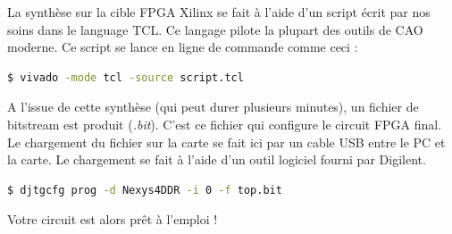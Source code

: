 La synthèse sur la cible FPGA Xilinx se fait à l'aide d'un script écrit par nos soins dans le language TCL. Ce langage pilote la plupart des outils de CAO moderne.
Ce script se lance en ligne de commande comme ceci :

\begin{lstlisting}[language=bash]
  $ vivado -mode tcl -source script.tcl
\end{lstlisting}

A l'issue de cette synthèse (qui peut durer plusieurs minutes), un fichier de bitstream est produit ({\it .bit}). C'est ce fichier qui configure le circuit FPGA final.
Le chargement du fichier sur la carte se fait ici par un cable USB entre le PC et la carte. Le chargement se fait à l'aide d'un outil logiciel fourni par Digilent.

\begin{lstlisting}[language=bash]
  $ djtgcfg prog -d Nexys4DDR -i 0 -f top.bit
\end{lstlisting}
Votre circuit est alors prêt à l'emploi !

